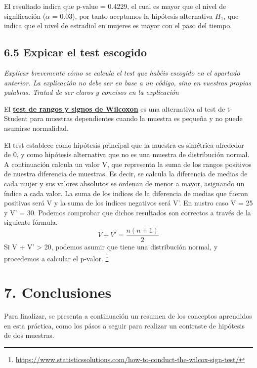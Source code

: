 \documentclass[
]{article}
\begin{document}
El resultado indica que p-value = 0.4229, el cual es mayor que el nivel
de significación (\(\alpha\) = 0.03), por tanto aceptamos la hipótesis
alternativa \(H_{1}\), que indica que el nivel de estradiol en mujeres
es mayor con el paso del tiempo.

\hypertarget{expicar-el-test-escogido}{%
\subsection{6.5 Expicar el test
escogido}\label{expicar-el-test-escogido}}

\emph{Explicar brevemente cómo se calcula el test que habéis escogido en
el apartado anterior. La explicación no debe ser en base a un código,
sino en vuestras propias palabras. Tratad de ser claros y concisos en la
explicación}

El
\href{https://www.r-bloggers.com/wilcoxon-signed-rank-test/}{\textbf{test
de rangos y signos de Wilcoxon}} es una alternativa al test de t-Student
para muestras dependientes cuando la muestra es pequeña y no puede
asumirse normalidad.

El test establece como hipótesis principal que la muestra es simétrica
alrededor de 0, y como hipótesis alternativa que no es una muestra de
distribución normal. A continuación calcula un valor V, que representa
la suma de los rangos positivos de nuestra diferencia de muestras. Es
decir, se calcula la diferencia de medias de cada mujer y sus valores
absolutos se ordenan de menor a mayor, asignando un índice a cada valor.
La suma de los indices de la diferencia de medias que fueron positivas
será V y la suma de los indices negativos será V'. En nustro caso V = 25
y V' = 30. Podemos comprobar que dichos resultados son correctos a
través de la siguiente fórmula. \[V + V' = \frac{n(n + 1)}{2}\] Si V +
V' \textgreater{} 20, podemos asumir que tiene una distribución normal,
y procedemos a calcular el p-valor. \footnote{\url{https://www.statisticssolutions.com/how-to-conduct-the-wilcox-sign-test/}}

\hypertarget{conclusiones}{%
\section{7. Conclusiones}\label{conclusiones}}

Para finalizar, se presenta a continuación un resumen de los conceptos
aprendidos en esta práctica, como los pásos a seguir para realizar un
contraste de hipótesis de dos muestras.
\end{document}
